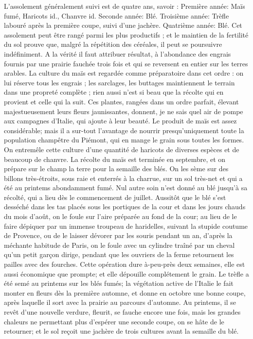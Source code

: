 L'assolement généralement suivi est de quatre ans, savoir :
Première année: Maïs fumé, Haricots id., Chanvre id.
Seconde année: Blé.
Troisième année: Trèfle labouré après la première coupe, suivi d'une jachère.
Quatrième année: Blé.
Cet assolement peut être rangé parmi les plus productifs ; et le maintien de la fertilité du sol prouve que, malgré la répétition des céréales, il peut se poursuivre indéfiniment. A la vérité il faut attribuer\setcounter{page}{406} résultat, à l'abondance des engrais fournis par une prairie fauchée trois fois et qui se reversent en entier sur les terres arables.
La culture du maïs est regardée comme préparatoire dans cet ordre : on lui réserve tous les engrais ; les sarclages, les buttages maintiennent le terrain dans une propreté complète ; rien aussi n'est si beau que la récolte qui en provient et celle qui la suit.
Ces plantes, rangées dans un ordre parfait, élevant majestueusement leurs fleurs jaunissantes, donnent, je ne sais quel air de pompe aux campagnes d'Italie, qui ajoute à leur beauté.
Le produit de maïs est assez considérable; mais il a sur-tout l'avantage de nourrir presqu'uniquement toute la population champêtre du Piémont, qui en mange le grain sous toutes les formes. On entremêle cette culture d'une quantité de haricots de diverses espèces et de beaucoup de chanvre.
La récolte du maïs est terminée en septembre, et on prépare sur le champ la terre pour la semaille des blés. On les sème sur des billons très-étroits, sous raie et enterrés à la charrue, sur un sol très-net et qui a été au printems abondamment fumé. Nul autre soin n'est donné au blé jusqu'à sa récolté, qui a lieu dès le commencement de juillet.
Aussitôt que le blé s'est desséché dans les\setcounter{page}{407} tas placés sous les portiques de la cour et dans les jours chauds du mois d'août, on le foule sur l'aire préparée au fond de la cour; au lieu de le faire dépiquer par un immense troupeau de haridelles, suivant la stupide coutume de Provence, ou de le laisser dévorer par les souris pendant un an, d'après la méchante habitude de Paris, on le foule avec un cylindre traîné par un cheval qu'un petit garçon dirige, pendant que les ouvriers de la ferme retournent les pailles avec des fourches. Cette opération dure à-peu-près deux semaines, elle est aussi économique que prompte; et elle dépouille complétement le grain.
Le trèfle a été semé au printems sur les blés fumés; la végétation active de l'Italie le fait monter en fleurs dès la première automne, et donne en octobre une bonne coupe, après laquelle il sort avec la prairie au parcours d'automne. Au printems, il se revêt d'une nouvelle verdure, fleurit, se fauche encore une fois, mais les grandes chaleurs ne permettant plus d'espérer une seconde coupe, on se hâte de le retourner; et le sol reçoit une jachère de trois cultures avant la semaille du blé.
